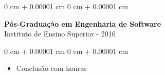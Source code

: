 \documentclass[10pt, letterpaper]{article}
\newenvironment{highlights}{
    \begin{itemize}[
        topsep=0.10 cm,
        parsep=0.10 cm,
        partopsep=0pt,
        itemsep=0pt,
        leftmargin=0 cm + 10pt
    ]
}{
    \end{itemize}
}
\newenvironment{onecolentry}{
    \begin{adjustwidth}{
        0 cm + 0.00001 cm
    }{
        0 cm + 0.00001 cm
    }
}{
    \end{adjustwidth}
}
\begin{document}
\vspace{0.2cm}

\begin{onecolentry}
    \setcolumnwidth{\fill, 4.5cm}
    \begin{paracol}{2}
        \textbf{Pós-Graduação em Engenharia de Software} \\ Instituto de Ensino Superior
        \switchcolumn
         - 2016
    \end{paracol}
\end{onecolentry}
\vspace{0.10cm}
\begin{onecolentry}
    \begin{highlights}
                \item Conclusão com honras
    \end{highlights}
\end{onecolentry}
\end{document}
